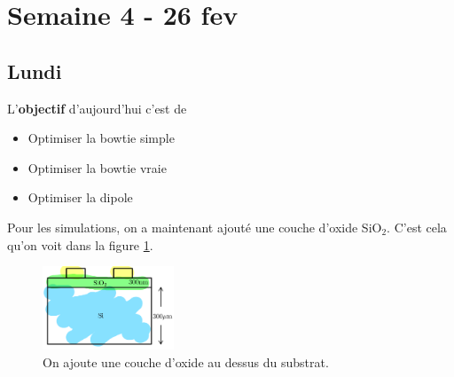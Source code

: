 \section{Semaine 4 - 26 fev}

\subsection{Lundi}

L'\textbf{objectif} d'aujourd'hui c'est de
\begin{itemize}
    \item Optimiser la bowtie simple
    \item Optimiser la bowtie vraie
    \item Optimiser la dipole
\end{itemize}

Pour les simulations, on a maintenant ajouté une couche d'oxide SiO$_{2}$. C'est cela qu'on voit dans la figure \ref{fig:oxide_film}.

\begin{figure}
    \centering
    \includegraphics[width=0.35\textwidth]{texfigures/ocide_film.png}
    \caption{\label{fig:oxide_film} On ajoute une couche d'oxide au dessus du substrat.}
\end{figure}